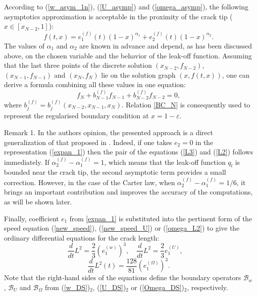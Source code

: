 According to (\ref{w_asym_1n}), (\ref{U_asymp}) and
(\ref{omega_asymp}), the following asymptotics approximation
is
acceptable in the proximity of the crack tip ($x\in[x_{N-2},1]$):
\begin{equation}
\label{expan_1}
f(t,x)=e_1^{(f)}(t)(1-x)^{\alpha_1}+e_2^{(f)}(t)(1-x)^{\alpha_2}.
\end{equation}
The values of $\alpha_1$ and $\alpha_2$ are known in advance and
depend, as has been discussed above, on the chosen variable and
the behavior of the leak-off function. Assuming that the last three
points of the discrete solution $(x_{N-2},f_{N-2})$,
$(x_{N-1},f_{N-1})$ and $(x_{N},f_{N})$ lie on the solution graph
$(x,f(t,x))$, one can derive a formula combining all these values in
one equation:
\begin{equation}
\label{BC_N} f_N+
b_{N-1}^{(f)}f_{N-1}+b_{N-2}^{(f)}f_{N-2}=0,
\end{equation}
where $b_j^{(f)}=b_j^{(f)}(x_{N-2},x_{N-1},x_{N})$. Relation
\eqref{BC_N} is consequently used to represent the regularised
boundary condition at $x=1-\varepsilon$.

{\sc Remark 1}. In the authors opinion, the presented approach is a
direct generalization of that proposed in \cite{Linkov_1}. Indeed,
if one takes $e_2=0$ in the representation (\ref{expan_1}) then the
pair of the equations (\ref{L3}) and (\ref{L2}) follows immediately.
If $\alpha_2^{(f)}-\alpha_1^{(f)}=1$, which means that the leak-off
function $q_l$ is bounded near the crack tip, the second asymptotic
term provides a small correction. However, in the case of the Carter
law, when $\alpha_2^{(f)}-\alpha_1^{(f)}=1/6$, it brings an
important contribution and improves the accuracy of the computations,
as will be shown later.

Finally, coefficient $e_1$ from \eqref{expan_1} is substituted into
the pertinent form of the speed equation (\ref{new_speed}),
(\ref{new_speed_U}) or (\ref{omega_L2}) to give the ordinary
differential equations for the crack length:
\[
\frac{d}{dt}L^2=\frac{2}{3}\left(e_1^{(w)}\right)^3,\quad \frac{d
}{dt}L^2=\frac{2}{3} e_1^{(U)},\quad
\]
\begin{equation}
\label{new_speed_common} \frac{d}{d t}L^2(t)=\frac{128}{81}
\left(e_1^{(\Omega)}\right)^3.
\end{equation}
Note that the right-hand sides of the equations define the boundary
operators $\mathcal{B}_w$, $\mathcal{B}_U$ and $\mathcal{B}_\Omega$
from (\ref{w_DS})$_2$, (\ref{U_DS})$_2$ or (\ref{Omega_DS})$_2$,
respectively.

